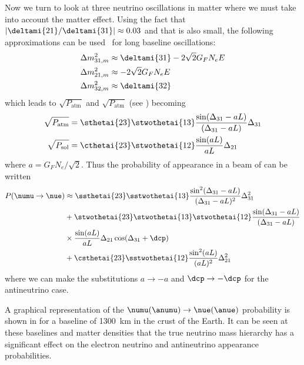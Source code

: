 Now we turn to look at three neutrino oscillations in matter where we must take into account the matter effect.
Using the fact that $|\deltami{21}/\deltami{31}| \approx 0.03$ and that  is also small, the following approximations can be used~\cite{Nunokawa_2008} for long baseline oscillations:
\begin{align}
  \Delta m^{2}_{31, m} &\approx \deltami{31} - 2 \sqrt{2} G_{F} N_{e} E \\
  \Delta m^{2}_{21, m} &\approx - 2 \sqrt{2} G_{F} N_{e} E \\
  \Delta m^{2}_{32, m} &\approx \deltami{32}
\end{align}
which leads to $\sqrt{P_{\text{atm}}}$ and $\sqrt{P_{\text{atm}}}$ (see ) becoming~\cite{Nunokawa_2008}
\begin{align}
  \sqrt{P_{\text{atm}}} &= \sthetai{23} \stwothetai{13} \frac{ \sin(\Delta_{31}-aL) }{ (\Delta_{31} - aL) } \Delta_{31} \\
  \sqrt{P_{\text{sol}}} &= \cthetai{23} \stwothetai{12} \frac{ \sin(aL) }{ aL } \Delta_{21}
\end{align}
where $a = G_{F}N_{e} / \sqrt{2}$.
Thus the probability of \nue appearance in a beam of \numu can be written
\begin{align}
\begin{split}
  P(\numu \rightarrow \nue) &\approx \ssthetai{23} \sstwothetai{13} \frac{ \sin^{2}(\Delta_{31}-aL) }{ (\Delta_{31} - aL)^{2} } \Delta_{31}^{2} \\
  &+ \stwothetai{23} \stwothetai{13} \stwothetai{12} \frac{ \sin(\Delta_{31}-aL) }{ (\Delta_{31} - aL) } \\
  & \times \frac{ \sin(aL) }{aL} \Delta_{21} \cos(\Delta_{31} + \dcp) \\
  &+ \csthetai{23}\sstwothetai{12} \frac{ \sin^{2}(aL) }{(aL)^{2}} \Delta_{21}^{2} 
\end{split}
\end{align}
where we can make the substitutions $a \rightarrow -a$ and $\dcp \rightarrow -\dcp$ for the antineutrino case.

A graphical representation of the $\numu(\anumu) \rightarrow \nue(\anue)$ probability is shown in  for a baseline of 1300~km in the crust of the Earth.
It can be seen at these baselines and matter densities that the true neutrino mass hierarchy has a significant effect on the electron neutrino and antineutrino appearance probabilities.

